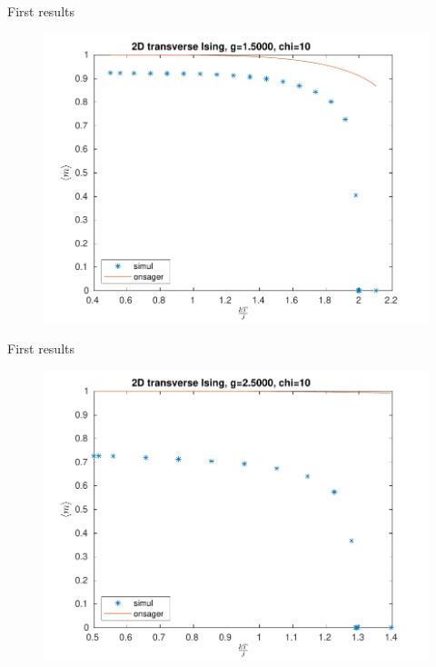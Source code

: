 \documentclass[aspectratio=169]{beamer}
\begin{document}
\begin{frame}{First results}
    \begin{figure}
        \includegraphics[scale=0.4]{Figures/g15.pdf}
    \end{figure}
\end{frame}

\begin{frame}{First results}
    \begin{figure}
        \includegraphics[scale=0.4]{Figures/g25.pdf}
    \end{figure}
\end{frame}
\end{document}
